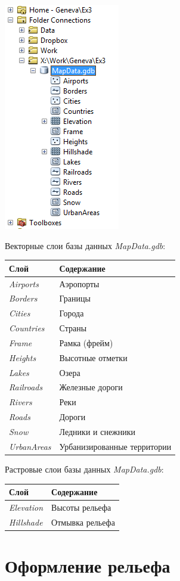 \documentclass[]{book}
\theoremstyle{definition}
\theoremstyle{definition}
\theoremstyle{definition}
\theoremstyle{remark}
\begin{document}
\begin{enumerate}
  \includegraphics{images/Ex02/image10.png}
\end{enumerate}

Векторные слои базы данных \emph{MapData.gdb}:

\begin{longtable}[]{@{}ll@{}}
\toprule
Слой & Содержание\tabularnewline
\midrule
\endhead
\emph{Airports} & Аэропорты\tabularnewline
\emph{Borders} & Границы\tabularnewline
\emph{Cities} & Города\tabularnewline
\emph{Countries} & Страны\tabularnewline
\emph{Frame} & Рамка (фрейм)\tabularnewline
\emph{Heights} & Высотные отметки\tabularnewline
\emph{Lakes} & Озера\tabularnewline
\emph{Railroads} & Железные дороги\tabularnewline
\emph{Rivers} & Реки\tabularnewline
\emph{Roads} & Дороги\tabularnewline
\emph{Snow} & Ледники и снежники\tabularnewline
\emph{UrbanAreas} & Урбанизированные территории\tabularnewline
\bottomrule
\end{longtable}

Растровые слои базы данных \emph{MapData.gdb}:

\begin{longtable}[]{@{}ll@{}}
\toprule
Слой & Содержание\tabularnewline
\midrule
\endhead
\emph{Elevation} & Высоты рельефа\tabularnewline
\emph{Hillshade} & Отмывка рельефа\tabularnewline
\bottomrule
\end{longtable}

\hypertarget{map-design-general-relief}{%
\section{Оформление рельефа}\label{map-design-general-relief}}
\end{document}
